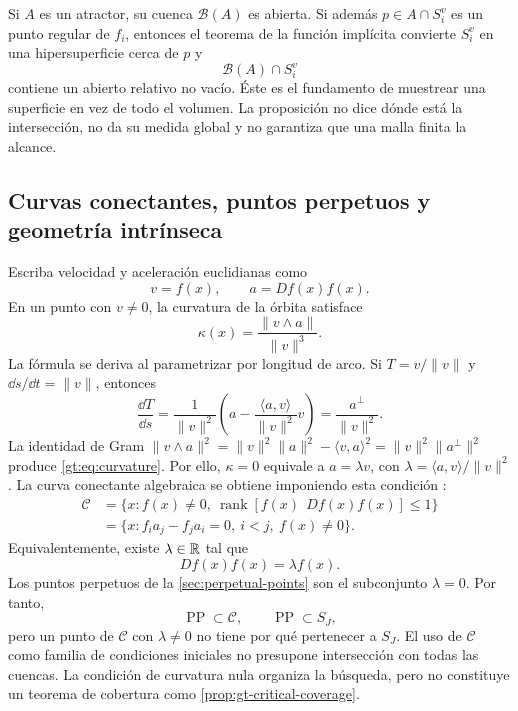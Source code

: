 Si $A$ es un atractor, su cuenca $\mathcal B(A)$ es abierta. Si además
$p\in A\cap S_i^v$ es un punto regular de $f_i$, entonces el teorema de la
función implícita convierte $S_i^v$ en una hipersuperficie cerca de $p$ y
\begin{equation}
 \mathcal B(A)\cap S_i^v
 \label{gt:eq:relative-open-basin}
\end{equation}
contiene un abierto relativo no vacío. Éste es el fundamento de muestrear una
superficie en vez de todo el volumen. La proposición no dice dónde está la
intersección, no da su medida global y no garantiza que una malla finita la
alcance.

\subsection{Curvas conectantes, puntos perpetuos y geometría intrínseca}
\label{subsec:gt-connecting}

Escriba velocidad y aceleración euclidianas como
\begin{equation}
 v=f(x),\qquad a=Df(x)f(x).
 \label{gt:eq:va}
\end{equation}
En un punto con $v\ne0$, la curvatura de la órbita satisface
\begin{equation}
 \kappa(x)=\frac{\lVert v\wedge a\rVert}{\lVert v\rVert^3}.
 \label{gt:eq:curvature}
\end{equation}
La fórmula se deriva al parametrizar por longitud de arco. Si
\(T=v/\|v\|\) y \(\dd s/\dd t=\|v\|\), entonces
\[
 \frac{\dd T}{\dd s}
 =\frac1{\|v\|^2}
 \left(a-\frac{\langle a,v\rangle}{\|v\|^2}v\right)
 =\frac{a^\perp}{\|v\|^2}.
\]
La identidad de Gram
\(\|v\wedge a\|^2=\|v\|^2\|a\|^2-\langle v,a\rangle^2
=\|v\|^2\|a^\perp\|^2\) produce \cref{gt:eq:curvature}.
Por ello, \(\kappa=0\) equivale a
\(a=\lambda v\), con \(\lambda=\langle a,v\rangle/\|v\|^2\).
La curva conectante algebraica se obtiene imponiendo esta condición
\cite{GilmoreEtAl2010Connecting,GuanXie2021Connecting}:
\begin{align}
 \mathcal C
 &=\{x:f(x)\ne0,\ \operatorname{rank}[f(x)\ \ Df(x)f(x)]\le1\}
 \label{gt:eq:connecting-rank}\\
 &=\{x:f_i a_j-f_j a_i=0,\ i<j,\ f(x)\ne0\}.
 \label{gt:eq:connecting-minors}
\end{align}
Equivalentemente, existe $\lambda\in\mathbb{R}$ tal que
\begin{equation}
 Df(x)f(x)=\lambda f(x).
 \label{gt:eq:connecting-eigen}
\end{equation}
Los puntos perpetuos de la \cref{sec:perpetual-points} son el subconjunto
$\lambda=0$. Por tanto,
\begin{equation}
 \operatorname{PP}\subset\mathcal C,
 \qquad
 \operatorname{PP}\subset S_J,
 \label{gt:eq:pp-inclusions}
\end{equation}
pero un punto de $\mathcal C$ con $\lambda\ne0$ no tiene por qué pertenecer a
$S_J$. El uso de $\mathcal C$ como familia de condiciones iniciales no
presupone intersección con todas las cuencas. La condición de curvatura nula
organiza la búsqueda, pero no constituye un teorema de cobertura como
\cref{prop:gt-critical-coverage}.


